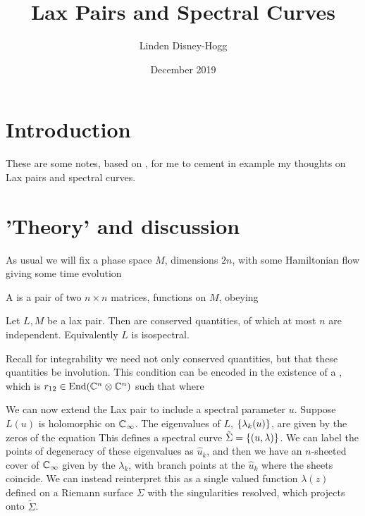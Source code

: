 \documentclass{article}
\title{Lax Pairs and Spectral Curves}
\author{Linden Disney-Hogg}
\date{December 2019}
\begin{document}
\maketitle
\tableofcontents

\section{Introduction}
These are some notes, based on \cite{BeisertIntroductionNotes}, for me to cement in example my thoughts on Lax pairs and spectral curves. 

\section{'Theory' and discussion}

As usual we will fix a phase space $M$, dimensions $2n$, with some Hamiltonian flow giving some time evolution 

\begin{definition}
A  is a pair of two $n \times n$ matrices, functions on $M$, obeying 
\end{definition}

\begin{prop}
Let $L,M$ be a lax pair. Then 
are conserved quantities, of which at most $n$ are independent. Equivalently $L$ is isospectral. 
\end{prop}

Recall for integrability we need not only conserved quantities, but that these quantities be involution. This condition can be encoded in the existence of a , which is $r_{12} \in \operatorname{End}(\mathbb{C}^n \otimes \mathbb{C}^n)$ such that 
where 

We can now extend the Lax pair to include a spectral parameter $u$. Suppose $L(u)$ is holomorphic on $\mathbb{C}_\infty$. The eigenvalues of $L$, $\left\{ \lambda_k(u) \right\}$, are given by the zeros of the equation 
This defines a spectral curve $\tilde{\Sigma}=\left\{ (u,\lambda) \right\}$. We can label the points of degeneracy of these eigenvalues as $\hat{u}_k$, and then we have an $n$-sheeted cover of $\mathbb{C}_\infty$ given by the $\lambda_k$, with branch points at the $\hat{u}_k$ where the sheets coincide. We can instead reinterpret this as a single valued function $\lambda(z)$ defined on a Riemann surface $\Sigma$ with the singularities resolved, which projects onto $\tilde{\Sigma}$.
\begin{center}
\end{center}
\end{document}
